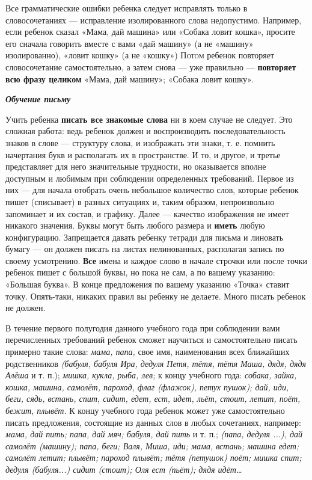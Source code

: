 \documentclass[a5paper]{book}
\renewcommand{\emph}[1]{\textit{#1}}
\begin{document}
Все грамматические ошибки ребенка следует исправлять только в
словосочетаниях --- исправление изолированного слова недопустимо.
Например, если ребенок сказал «Мама, дай машина» или «Собака ловит
кошка», просите его сначала говорить вместе с вами «дай машину» (а не
«машину» изолированно), «ловит кошку» (а не «кошку»\textsc{) Потом}
ребенок повторяет словосочетание самостоятельно, а затем снова --- уже
правильно --- \textbf{повторяет всю фразу целиком} «Мама, дай машину»;
«Собака ловит кошку».

\emph{\textbf{Обучение письму}}

Учить ребенка \textbf{писать все знакомые слова} ни в коем случае не
следует. Это сложная работа: ведь ребенок должен и воспроизводить
последовательность знаков в слове --- структуру слова, и изображать эти
знаки, т. е. помнить начертания букв и располагать их в пространстве. И
то, и другое, и третье представляет для него значительные трудности, но
оказывается вполне доступным и любимым при соблюдении определенных
требований. Первое из них --- для начала отобрать очень небольшое
количество слов, которые ребенок пишет (списывает) в разных ситуациях и,
таким образом, непроизвольно запоминает и их состав, и графику. Далее
--- качество изображения не имеет никакого значения. Буквы могут быть
любого размера и \textbf{иметь} любую конфигурацию. Запрещается давать
ребенку тетради для письма и линовать бумагу --- он должен писать на
листах нелинованных, располагая запись по своему усмотрению.
\textbf{Все} имена и каждое слово в начале строчки или после точки
ребенок пишет с большой буквы, но пока не сам, а по вашему указанию:
«Большая буква». В конце предложения по вашему указанию «Точка» ставит
точку. Опять-таки, никаких правил вы ребенку не делаете. Много писать
ребенок не должен.

В течение первого полугодия данного учебного года при соблюдении вами
перечисленных требований ребенок сможет научиться и самостоятельно
писать примерно такие слова: \emph{мама, папа,} свое имя, наименования
всех ближайших родственников \emph{(бабуля, бабуля Ира, дедуля Петя,
тётя, тётя Маша, дядя, дядя Алёша} и т. п.); \emph{мишка, кукла, рыба,
лев;} к концу учебного года: \emph{собака, зайка, кошка, машина,
самолёт, пароход, флаг (флажок), петух пушок); дай, иди, беги, сядь,
встань, спит, сидит, едет, ест, идет, льёт, стоит, летит, поёт, бежит,
плывёт.} К концу учебного года ребенок может уже самостоятельно писать
предложения, состоящие из данных слов в любых сочетаниях, например:
\emph{мама, дай пить; папа, дай мяч; бабуля, дай пить} и т. п.;
\emph{(папа, дедуля ...), дай самолёт (машину); папа, беги; Валя, Миша,
иди; мама, встань; машина едет; самолёт летит; плывёт; пароход плывёт;
тётя (петушок) поёт; мишка спит; дедуля (бабуля...) сидит (стоит); Оля
ест (пьёт); дядя идёт\ldots{}}
\end{document}
